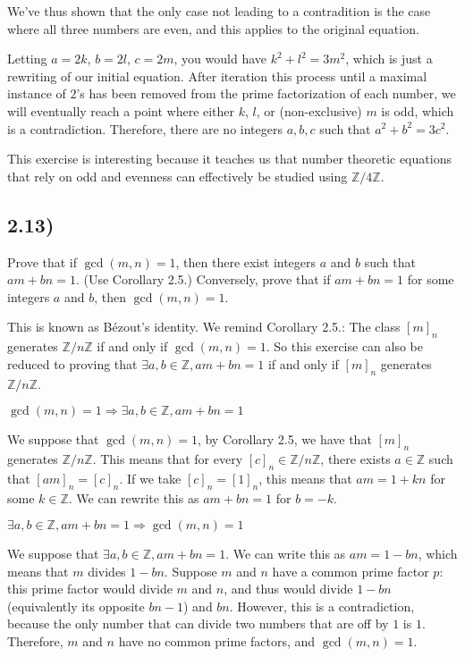 \documentclass[12pt, letterpaper, twoside]{report}
\begin{document}
We've thus shown that the only case not leading to a contradition is the case where all three numbers are even, and this applies to the original equation.

Letting $a = 2k$, $b = 2l$, $c = 2m$, you would have $k^2 + l^2 = 3m^2$, which is just a rewriting of our initial equation. After iteration this process until a maximal instance of $2$'s has been removed from the prime factorization of each number, we will eventually reach a point where either $k$, $l$, or (non-exclusive) $m$ is odd, which is a contradiction. Therefore, there are no integers $a, b, c$ such that $a^2 + b^2 = 3c^2$.

This exercise is interesting because it teaches us that number theoretic equations that rely on odd and evenness can effectively be studied using $\mathbb{Z}/4\mathbb{Z}$.


\subsection*{2.13)}

Prove that if $\gcd(m, n) = 1$, then there exist integers $a$ and $b$ such that $am + bn = 1$. (Use Corollary 2.5.) Conversely, prove that if $am + bn = 1$ for some integers $a$ and $b$, then $\gcd(m, n) = 1$.

This is known as Bézout's identity. We remind Corollary 2.5.: The class $[m]_n$ generates $\mathbb{Z}/n\mathbb{Z}$ if and only if $\gcd(m, n) = 1$. So this exercise can also be reduced to proving that $\exists a, b \in \mathbb{Z}, am + bn = 1$ if and only if $[m]_n$ generates $\mathbb{Z}/n\mathbb{Z}$.

\textbf{$\gcd(m, n) = 1 \Rightarrow \exists a, b \in \mathbb{Z}, am + bn = 1$}

We suppose that $\gcd(m,n) = 1$, by Corollary 2.5, we have that $[m]_n$ generates $\mathbb{Z}/n\mathbb{Z}$. This means that for every $[c]_n \in \mathbb{Z}/n\mathbb{Z}$, there exists $a \in \mathbb{Z}$ such that $[am]_n = [c]_n$. If we take $[c]_n = [1]_n$, this means that $am = 1 + kn$ for some $k \in \mathbb{Z}$. We can rewrite this as $am + bn = 1$ for $b = -k$.

\textbf{$\exists a, b \in \mathbb{Z}, am + bn = 1 \Rightarrow \gcd(m, n) = 1$}

We suppose that $\exists a, b \in \mathbb{Z}, am + bn = 1$. We can write this as $am = 1 - bn$, which means that $m$ divides $1 - bn$. Suppose $m$ and $n$ have a common prime factor $p$: this prime factor would divide $m$ and $n$, and thus would divide $1 - bn$ (equivalently its opposite $bn - 1$) and $bn$. However, this is a contradiction, because the only number that can divide two numbers that are off by $1$ is $1$. Therefore, $m$ and $n$ have no common prime factors, and $\gcd(m, n) = 1$.
\end{document}
